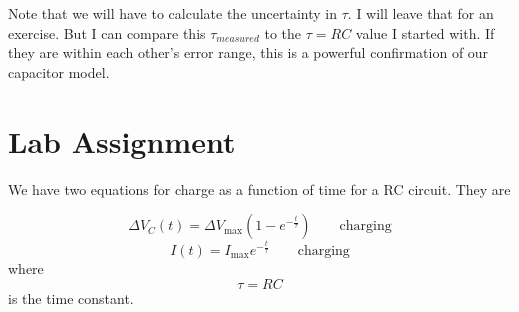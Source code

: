Note that we will have to calculate the uncertainty in $\tau .$ I will leave
that for an exercise. But I can compare this $\tau _{measured}$ to the $\tau
=RC$ value I started with. If they are within each other's error range, this
is a powerful confirmation of our capacitor model.

\vspace*{\fill}%
\pagebreak

\section{Lab Assignment}

We have two equations for charge as a function of time for a RC circuit.
They are

\begin{equation*}
\Delta V_{C}\left( t\right) =\Delta V_{\max }\left( 1-e^{-\frac{t}{\tau }%
}\right) \qquad \text{charging}
\end{equation*}%
\begin{equation*}
I\left( t\right) =I_{\max }e^{-\frac{t}{\tau }}\qquad \text{charging}
\end{equation*}%
where 
\begin{equation}
\tau =RC
\end{equation}%
is the time constant.

